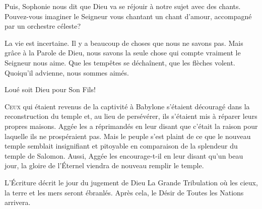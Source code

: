 
Puis, Sophonie nous dit que Dieu va \Og se réjouir à notre sujet
 avec des chants. \Fg{} Pouvez-vous imaginer le Seigneur vous chantant
 un chant d'amour, accompagné par un orchestre céleste? 

La vie est incertaine. Il y a beaucoup de choses que nous ne savons pas.
 Mais grâce à la Parole de Dieu, nous savons la seule chose
 qui compte vraiment\frcolon{} le Seigneur nous aime. Que les tempêtes se déchaînent,
 que les flèches volent. Quoiqu'il advienne, nous sommes aimés. 

Loué soit Dieu pour Son Fils! 

\dvrule






\lettrine{C}{eux} qui étaient revenus de la captivité à Babylone
 s'étaient découragé dans la reconstruction du temple et,
 au lieu de persévérer, ils s'étaient mis à réparer leurs propres maisons.
 Aggée les a réprimandés en leur disant que c'était la raison
 pour laquelle ils ne prospéraient pas. Mais le peuple s'est plaint
 de ce que le nouveau temple semblait insignifiant et pitoyable
 en comparaison de la splendeur du temple de Salomon.
 Aussi, Aggée les encourage-t-il en leur disant qu'un beau jour,
 la gloire de l'Éternel viendra de nouveau remplir le temple. 


L'Écriture décrit le jour du jugement de Dieu
 \ocadr La Grande Tribulation \fcadr{} où les cieux,
 la terre et les mers seront ébranlés. Après cela,
 le \Og Désir de Toutes les Nations \Fg{} arrivera. 

